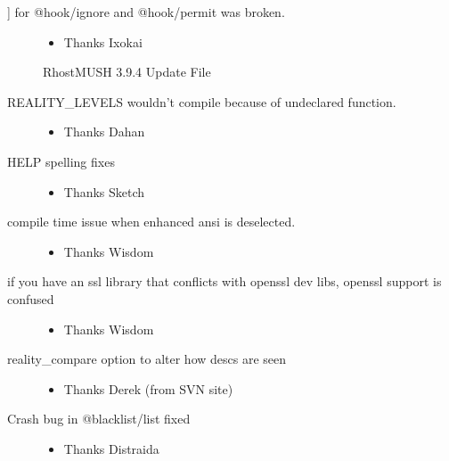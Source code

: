 \documentclass[letterpaper,10pt,english]{sphinxmanual}
\begin{document}
\begin{description}
\begin{itemize}
\end{itemize}

\item[{{]} for @hook/ignore and @hook/permit was broken.}] \leavevmode\begin{itemize}
\item {} 
\sphinxAtStartPar
Thanks Ixokai

\end{itemize}

\sphinxAtStartPar
RhostMUSH 3.9.4 Update File

\item[{REALITY\_LEVELS wouldn’t compile because of undeclared function.}] \leavevmode\begin{itemize}
\item {} 
\sphinxAtStartPar
Thanks Dahan

\end{itemize}

\item[{HELP spelling fixes}] \leavevmode\begin{itemize}
\item {} 
\sphinxAtStartPar
Thanks Sketch

\end{itemize}

\item[{compile time issue when enhanced ansi is deselected.}] \leavevmode\begin{itemize}
\item {} 
\sphinxAtStartPar
Thanks Wisdom

\end{itemize}

\item[{if you have an ssl library that conflicts with openssl dev libs, openssl support is confused}] \leavevmode\begin{itemize}
\item {} 
\sphinxAtStartPar
Thanks Wisdom

\end{itemize}

\item[{reality\_compare \textendash{} option to alter how descs are seen}] \leavevmode\begin{itemize}
\item {} 
\sphinxAtStartPar
Thanks Derek (from SVN site)

\end{itemize}

\item[{Crash bug in @blacklist/list fixed}] \leavevmode\begin{itemize}
\item {} 
\sphinxAtStartPar
Thanks Distraida


\end{itemize}
\end{description}
\end{document}
